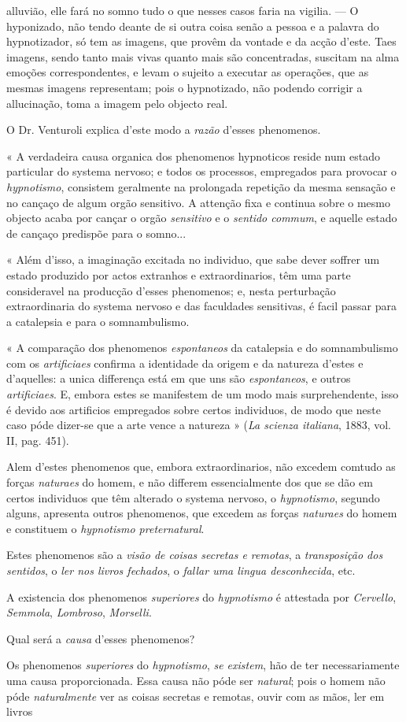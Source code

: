 alluvião, elle fará no somno tudo o que nesses casos faria na vigilia. --- O hyponizado, não tendo deante de si outra coisa senão a pessoa e a palavra do hypnotizador, só tem as imagens, que provêm da vontade e da acção d'este. Taes imagens, sendo tanto mais vivas quanto mais são concentradas, suscitam na alma emoções correspondentes, e levam o sujeito a executar as operações, que as mesmas imagens representam; pois o hypnotizado, não podendo corrigir a allucinação, toma a imagem pelo objecto real.\par O Dr. Venturoli explica d'este modo a \emph{razão} d'esses phenomenos.\par « A verdadeira causa organica dos phenomenos hypnoticos reside num estado particular do systema nervoso; e todos os processos, empregados para provocar o \emph{hypnotismo}, consistem geralmente na prolongada repetição da mesma sensação e no cançaço de algum orgão sensitivo. A attenção fixa e continua sobre o mesmo objecto acaba por cançar o orgão \emph{sensitivo} e o \emph{sentido commum}, e aquelle estado de cançaço predispõe para o somno...\par « Além d'isso, a imaginação excitada no individuo, que sabe dever soffrer um estado produzido por actos extranhos e extraordinarios, têm uma parte consideravel na producção d'esses phenomenos; e, nesta perturbação extraordinaria do systema nervoso e das faculdades sensitivas, é facil passar para a catalepsia e para o somnambulismo.\par « A comparação dos phenomenos \emph{espontaneos} da catalepsia e do somnambulismo com os \emph{artificiaes} confirma a identidade da origem e da natureza d'estes e d'aquelles: a unica differença está em que uns são \emph{espontaneos}, e outros \emph{artificiaes}. E, embora estes se manifestem de um modo mais surprehendente, isso é devido aos artificios empregados sobre certos individuos, de modo que neste caso póde dizer-se que a arte vence a natureza » (\emph{La scienza italiana}, 1883, vol. II, pag. 451).\par Alem d'estes phenomenos que, embora extraordinarios, não excedem comtudo as forças \emph{naturaes} do homem, e não differem essencialmente dos que se dão em certos individuos que têm alterado o systema nervoso, o \emph{hypnotismo}, segundo alguns, apresenta outros phenomenos, que excedem as forças \emph{naturaes} do homem e constituem o \emph{hypnotismo preternatural}.\par Estes phenomenos são a \emph{visão de coisas secretas e remotas}, a \emph{transposição dos sentidos}, o \emph{ler nos livros fechados}, o \emph{fallar uma lingua desconhecida}, etc.\par A existencia dos phenomenos \emph{superiores} do \emph{hypnotismo} é attestada por \emph{Cervello}, \emph{Semmola}, \emph{Lombroso}, \emph{Morselli}.\par Qual será a \emph{causa} d'esses phenomenos?\par Os phenomenos \emph{superiores} do \emph{hypnotismo}, \emph{se existem}, hão de ter necessariamente uma causa proporcionada. Essa causa não póde ser \emph{natural}; pois o homem não póde \emph{naturalmente} ver as coisas secretas e remotas, ouvir com as mãos, ler em livros 